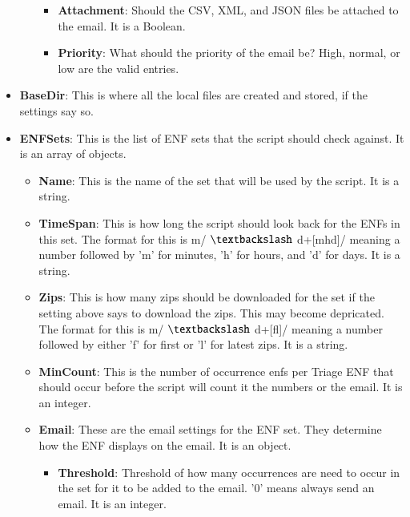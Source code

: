 \documentclass[a4paper,12pt]{report}
\begin{document}
\begin{itemize}
\begin{itemize}
\begin{itemize}
\item \textbf{Attachment}: Should the CSV, XML, and JSON files be attached to the email. It is a Boolean. \par
\item \textbf{Priority}: What should the priority of the email be? High, normal, or low are the valid entries. \par
\end{itemize}
\end{itemize}
\item \textbf{BaseDir}: This is where all the local files are created and stored, if the settings say so. \par
\item \textbf{ENFSets}: This is the list of ENF sets that the script should check against. It is an array of objects. \par
\begin{itemize}
\item \textbf{Name}: This is the name of the set that will be used by the script. It is a string. \par
\item \textbf{TimeSpan}: This is how long the script should look back for the ENFs in this set. The format for this is m/ $  \textbackslash  $ d+[mhd]/ meaning a number followed by 'm' for minutes, 'h' for hours, and 'd' for days. It is a string. \par
\item \textbf{Zips}: This is how many zips should be downloaded for the set if the setting above says to download the zips. This may become depricated. The format for this is m/ $  \textbackslash  $ d+[fl]/ meaning a number followed by either 'f' for first or 'l' for latest zips. It is a string. \par
\item \textbf{MinCount}: This is the number of occurrence enfs per Triage ENF that should occur before the script will count it the numbers or the email. It is an integer. \par
\item \textbf{Email}: These are the email settings for the ENF set. They determine how the ENF displays on the email. It is an object. \par
\begin{itemize}
\item \textbf{Threshold}: Threshold of how many occurrences are need to occur in the set for it to be added to the email. '0' means always send an email. It is an integer. \par

\end{itemize}
\end{itemize}
\end{itemize}
\end{document}
